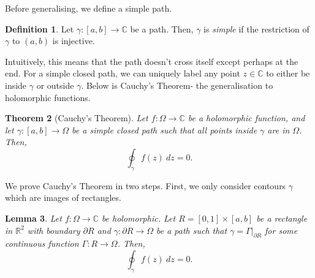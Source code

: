 \documentclass[a4paper, openany]{memoir}
\theoremstyle{definition}
\newtheorem{definition}{Definition}[section]
\theoremstyle{plain}
\newtheorem{theorem}[definition]{Theorem}
\newtheorem{lemma}[definition]{Lemma}
\begin{document}
Before generalising, we define a simple path.
\begin{definition}
Let $\gamma: [a, b] \to \mathbb{C}$ be a path. Then, $\gamma$ is \emph{simple} if the restriction of $\gamma$ to $(a, b)$ is injective.
\end{definition}
\noindent Intuitively, this means that the path doesn't cross itself except perhaps at the end. For a simple closed path, we can uniquely label any point $z \in \mathbb{C}$ to either be inside $\gamma$ or outside $\gamma$. Below is Cauchy's Theorem- the generalisation to holomorphic functions. 
\begin{theorem}[Cauchy's Theorem]
Let $f: \Omega \to \mathbb{C}$ be a holomorphic function, and let $\gamma: [a, b] \to \Omega$ be a simple closed path such that all points inside $\gamma$ are in $\Omega$. Then,
\[\oint_\gamma f(z) \ dz = 0.\]
\end{theorem}
We prove Cauchy's Theorem in two steps. First, we only consider contours $\gamma$ which are images of rectangles.
\begin{lemma}
Let $f: \Omega \to \mathbb{C}$ be holomorphic. Let $R = [0, 1] \times [a, b]$ be a rectangle in $\mathbb{R}^2$ with boundary $\partial R$ and $\gamma: \partial R \to \Omega$ be a path such that $\gamma = \Gamma|_{\partial R}$ for some continuous function $\Gamma: R \to \Omega$. Then,
\[\oint_\gamma f(z) \ dz = 0.\]
\end{lemma}
\end{document}
